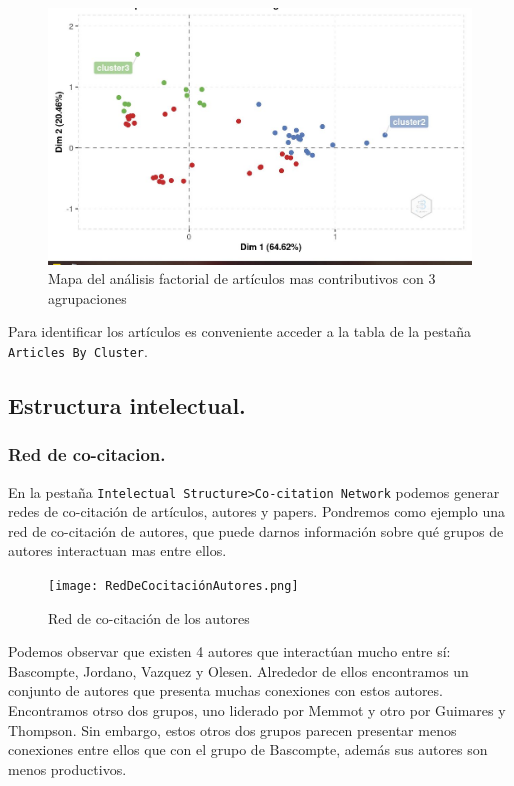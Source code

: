 \documentclass[
]{article}
\begin{document}
\begin{figure}
\centering
\includegraphics{MapaAnalisisFactorialArticulosMasContributivos.JPG}
\caption{Mapa del análisis factorial de artículos mas contributivos con
3 agrupaciones}
\end{figure}

Para identificar los artículos es conveniente acceder a la tabla de la
pestaña \texttt{Articles\ By\ Cluster}.

\hypertarget{estructura-intelectual.}{%
\subsection{Estructura intelectual.}\label{estructura-intelectual.}}

\hypertarget{red-de-co-citacion.}{%
\subsubsection{Red de co-citacion.}\label{red-de-co-citacion.}}

En la pestaña
\texttt{Intelectual\ Structure\textgreater{}Co-citation\ Network}
podemos generar redes de co-citación de artículos, autores y papers.
Pondremos como ejemplo una red de co-citación de autores, que puede
darnos información sobre qué grupos de autores interactuan mas entre
ellos.

\begin{figure}
\centering
\texttt{[image: RedDeCocitaciónAutores.png]}
\caption{Red de co-citación de los autores}
\end{figure}

Podemos observar que existen 4 autores que interactúan mucho entre sí:
Bascompte, Jordano, Vazquez y Olesen. Alrededor de ellos encontramos un
conjunto de autores que presenta muchas conexiones con estos autores.
Encontramos otrso dos grupos, uno liderado por Memmot y otro por
Guimares y Thompson. Sin embargo, estos otros dos grupos parecen
presentar menos conexiones entre ellos que con el grupo de Bascompte,
además sus autores son menos productivos.
\end{document}
